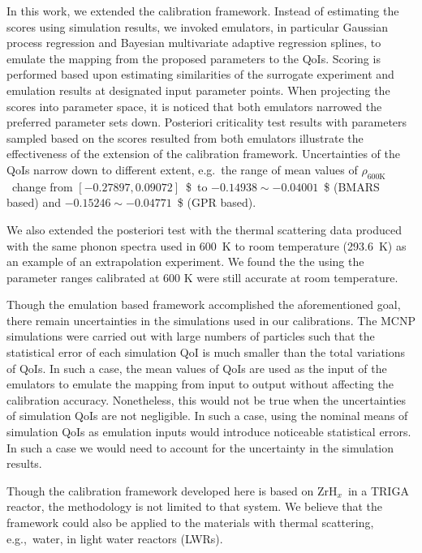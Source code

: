 \documentclass[review]{elsarticle}
\newcommand{\zh}{ZrH$_x$}
\newcommand{\tcb}[1]{{#1}}
\begin{document}
In this work, we extended the calibration framework. Instead of estimating the scores using simulation results, we invoked emulators, in particular  Gaussian process regression and Bayesian multivariate adaptive regression splines, to emulate the mapping from the proposed parameters to the QoIs. Scoring is performed based upon estimating similarities of the surrogate experiment and emulation results at designated input parameter points. When projecting the scores into parameter space, it is noticed that both emulators narrowed the preferred parameter sets down. Posteriori criticality test results with parameters sampled based on the scores resulted from both emulators illustrate the effectiveness of the extension of the calibration framework. Uncertainties of the QoIs narrow down to different extent, e.g.~the range of mean values of $\rho_{600\mathrm{K}}$~change from $[-0.27897,0.09072]$~\$\ to $-0.14938\sim -0.04001$\ \$ (BMARS based) and $-0.15246\sim -0.04771$~\$ (GPR based).

We also extended the posteriori test with the thermal scattering data produced with the same phonon spectra used in 600~K to room temperature (293.6~K) as an example of an extrapolation experiment. We found the the using the parameter ranges calibrated at 600 K  were still accurate at room temperature.

{Though the emulation based framework accomplished the aforementioned goal, there remain uncertainties in the simulations used in our calibrations. The MCNP simulations were carried out with large numbers of particles such that the statistical error of each simulation QoI is much smaller than the total variations of QoIs. In such a case, the mean values of QoIs are used as the input of the emulators to emulate the mapping from input to output without affecting the calibration accuracy. Nonetheless, this would not be true when the uncertainties of simulation QoIs are not negligible. In such a case, using the nominal means of simulation QoIs as emulation inputs would introduce noticeable statistical errors. In such a case we would need to account for the uncertainty in the simulation results.}

\tcb{Though the calibration framework developed here is based on \zh\ in a TRIGA reactor, the methodology is not limited to that system. We believe that the framework could also be applied to the materials with thermal scattering, e.g.,\ water, in light water reactors (LWRs).}
\end{document}
